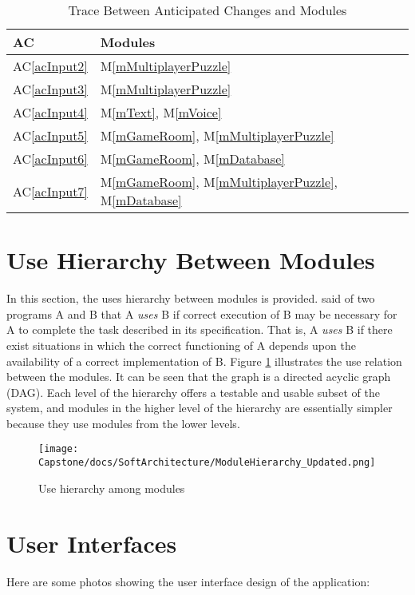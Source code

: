\documentclass[12pt, titlepage]{article}
\newcommand{\acref}[1]{AC\ref{#1}}
\newcommand{\mref}[1]{M\ref{#1}}
\begin{document}
\begin{table}[H]
\centering
\begin{tabular}{p{} p{}}
\toprule
\textbf{AC} & \textbf{Modules}\\
\midrule
\acref{acInput2} & \mref{mMultiplayerPuzzle}\\
\acref{acInput3} & \mref{mMultiplayerPuzzle}\\
\acref{acInput4} & \mref{mText}, \mref{mVoice}\\
\acref{acInput5} & \mref{mGameRoom}, \mref{mMultiplayerPuzzle}\\
\acref{acInput6} & \mref{mGameRoom}, \mref{mDatabase}\\
\acref{acInput7} & \mref{mGameRoom}, \mref{mMultiplayerPuzzle}, \mref{mDatabase}\\
\bottomrule
\end{tabular}
\caption{Trace Between Anticipated Changes and Modules}
\label{TblACT}
\end{table}

\section{Use Hierarchy Between Modules} \label{SecUse}

In this section, the uses hierarchy between modules is
provided. \citet{Parnas1978} said of two programs A and B that A {\em uses} B if
correct execution of B may be necessary for A to complete the task described in
its specification. That is, A {\em uses} B if there exist situations in which
the correct functioning of A depends upon the availability of a correct
implementation of B.  Figure \ref{FigUH} illustrates the use relation between
the modules. It can be seen that the graph is a directed acyclic graph
(DAG). Each level of the hierarchy offers a testable and usable subset of the
system, and modules in the higher level of the hierarchy are essentially simpler
because they use modules from the lower levels.

\begin{figure}[H]
\centering
\texttt{[image: Capstone/docs/SoftArchitecture/ModuleHierarchy\_Updated.png]}
\caption{Use hierarchy among modules}
\label{FigUH}
\end{figure}

\section{User Interfaces}
Here are some photos showing the user interface design of the application:
\end{document}
